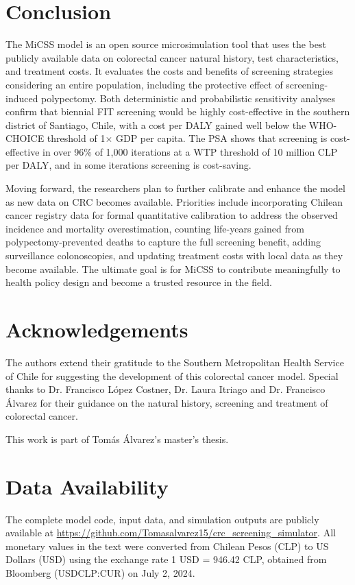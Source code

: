 \documentclass[sn-mathphys-num]{sn-jnl}%
\theoremstyle{thmstyleone}%
\theoremstyle{thmstyletwo}%
\theoremstyle{thmstylethree}%
\begin{document}
\section{Conclusion}

The MiCSS model is an open source microsimulation tool that uses the best publicly available data on colorectal cancer natural history, test characteristics, and treatment costs. It evaluates the costs and benefits of screening strategies considering an entire population, including the protective effect of screening-induced polypectomy. Both deterministic and probabilistic sensitivity analyses confirm that biennial FIT screening would be highly cost-effective in the southern district of Santiago, Chile, with a cost per DALY gained well below the WHO-CHOICE threshold of 1$\times$ GDP per capita. The PSA shows that screening is cost-effective in over 96\% of 1,000 iterations at a WTP threshold of 10 million CLP per DALY, and in some iterations screening is cost-saving.

Moving forward, the researchers plan to further calibrate and enhance the model as new data on CRC becomes available. Priorities include incorporating Chilean cancer registry data for formal quantitative calibration to address the observed incidence and mortality overestimation, counting life-years gained from polypectomy-prevented deaths to capture the full screening benefit, adding surveillance colonoscopies, and updating treatment costs with local data as they become available. The ultimate goal is for MiCSS to contribute meaningfully to health policy design and become a trusted resource in the field.

\section*{Acknowledgements}
The authors extend their gratitude to the Southern Metropolitan Health Service of Chile for suggesting the development of this colorectal cancer model. Special thanks to Dr. Francisco López Costner, Dr. Laura Itriago and Dr. Francisco Álvarez for their guidance on the natural history, screening and treatment of colorectal cancer.

This work is part of Tomás Álvarez's master’s thesis.

\section*{Data Availability}
The complete model code, input data, and simulation outputs are publicly available at \url{https://github.com/Tomasalvarez15/crc\_screening\_simulator}. All monetary values in the text were converted from Chilean Pesos (CLP) to US Dollars (USD) using the exchange rate 1 USD = 946.42 CLP, obtained from Bloomberg (USDCLP:CUR) on July 2, 2024.

\backmatter
\newpage

\end{document}
